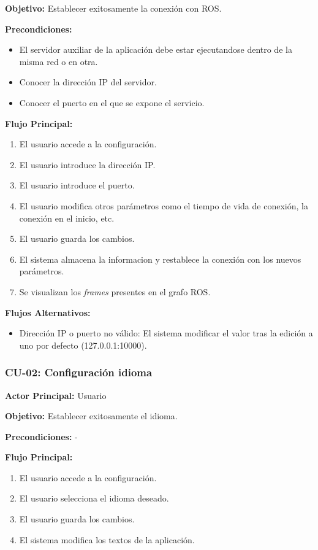\textbf{Objetivo:}
Establecer exitosamente la conexión con ROS.

\textbf{Precondiciones:}
\begin{itemize}
    \item El servidor auxiliar de la aplicación debe estar ejecutandose dentro de la misma red o en otra.
    \item Conocer la dirección IP del servidor.
    \item Conocer el puerto en el que se expone el servicio. 
\end{itemize}

\textbf{Flujo Principal:}
\begin{enumerate}
    \item El usuario accede a la configuración.
    \item El usuario introduce la dirección IP.
    \item El usuario introduce el puerto.
    \item El usuario modifica otros parámetros como el tiempo de vida de conexión, la conexión en el inicio, etc.
    \item El usuario guarda los cambios.
    \item El sistema almacena la informacion y restablece la conexión con los nuevos parámetros.
    \item Se visualizan los \textit{frames} presentes en el grafo ROS.
\end{enumerate}

\textbf{Flujos Alternativos:}
\begin{itemize}
    \item Dirección IP o puerto no válido: El sistema modificar el valor tras la edición a uno por defecto (127.0.0.1:10000).
\end{itemize}

\subsubsection{CU-02: Configuración idioma}

\textbf{Actor Principal:} Usuario

\textbf{Objetivo:}
Establecer exitosamente el idioma.

\textbf{Precondiciones:}
-

\textbf{Flujo Principal:}
\begin{enumerate}
    \item El usuario accede a la configuración.
    \item El usuario selecciona el idioma deseado.
    \item El usuario guarda los cambios.
    \item El sistema modifica los textos de la aplicación.
\end{enumerate}

